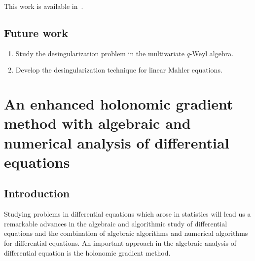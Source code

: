 \documentclass[10pt,a4paper]{article}
\begin{document}

This work is available in~\cite{KZ2018}.

\subsection{Future work}

\begin{enumerate}
 \item Study the desingularization problem in the multivariate $q$-Weyl algebra.
 \item Develop the desingularization technique for linear Mahler equations. 
\end{enumerate}

\section{An enhanced holonomic gradient method with algebraic and numerical analysis of differential equations} \label{SECT:HGM}

\subsection{Introduction}

Studying problems in differential equations which arose in statistics will lead us a remarkable advances in the algebraic and algorithmic study of differential equations and the combination of algebraic algorithms and numerical algorithms for differential equations. An important approach in the algebraic analysis of differential equation is the holonomic gradient method. 
\end{document}
